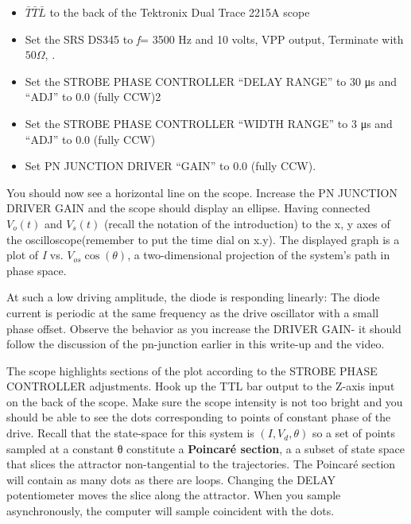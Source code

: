 \documentclass{../lab}
\begin{document}
\begin{itemize}
    \item $ \bar {T}\bar {T}\bar {L} $ to the back of the Tektronix Dual Trace 2215A scope

    \item Set the SRS DS345 to \emph{f}= 3500 Hz and 10 volts, VPP output, Terminate with $ 50\Omega $, .

    \item Set the STROBE PHASE CONTROLLER ``DELAY RANGE'' to 30 μs and ``ADJ'' to 0.0 (fully CCW)2

    \item Set the STROBE PHASE CONTROLLER ``WIDTH RANGE'' to 3 μs and ``ADJ'' to 0.0 (fully CCW)

    \item Set PN JUNCTION DRIVER ``GAIN'' to 0.0 (fully CCW).

\end{itemize}

You should now see a horizontal line on the scope. Increase the PN JUNCTION DRIVER GAIN and the scope should display an ellipse. Having connected $ V_o(t) $ and $ V_s(t) $ (recall the notation of the introduction) to the x, y axes of the oscilloscope(remember to put the time dial on x.y). The displayed graph is a plot of \emph{I} vs. $ V_{os}\cos {(\theta)} $, a two-dimensional projection of the system's path in phase space.

At such a low driving amplitude, the diode is responding linearly: The diode current is periodic at the same frequency as the drive oscillator with a small phase offset. Observe the behavior as you increase the DRIVER GAIN- it should follow the discussion of the pn-junction earlier in this write-up and the video.

The scope highlights sections of the plot according to the STROBE PHASE CONTROLLER adjustments. Hook up the TTL bar output to the Z-axis input on the back of the scope. Make sure the scope intensity is not too bright and you should be able to see the dots corresponding to points of constant phase of the drive. Recall that the state-space for this system is $ (I, V_d,\theta) $ so a set of points sampled at a constant θ constitute a \textbf{Poincaré section}, a a subset of state space that slices the attractor non-tangential to the trajectories. The Poincaré section will contain as many dots as there are loops. Changing the DELAY potentiometer moves the slice along the attractor. When you sample asynchronously, the computer will sample coincident with the dots.
\end{document}
